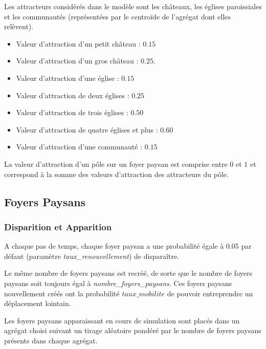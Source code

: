 \documentclass[a4paper,11pt]{article}
\begin{document}
{\bigskip
Les attracteurs considérés dans le modèle sont les châteaux, les églises paroissiales et les communautés (représentées par le centroïde de l'agrégat dont elles relèvent).
\begin{itemize}
	\item Valeur d'attraction d'un petit château : $0.15$
	\item Valeur d'attraction d'un gros château : $0.25$.
	\item Valeur d'attraction d'une église : $0.15$
	\item Valeur d'attraction de deux églises : $0.25$
	\item Valeur d'attraction de trois églises : $0.50$
	\item Valeur d'attraction de quatre églises et plus : $0.60$
	\item Valeur d'attraction d'une communauté : $0.15$
\end{itemize}

La valeur d'attraction d'un pôle sur un foyer paysan est comprise entre $0$ et $1$ et correspond à la somme des valeurs d'attraction des attracteurs du pôle.

\subsection{Foyers Paysans}

\subsubsection{Disparition et Apparition}
A chaque pas de temps, chaque foyer paysan a une probabilité égale à 0.05 par défaut (paramètre \textit{taux\_renouvellement}) de disparaître.

Le même nombre de foyers paysans est recréé, de sorte que le nombre de foyers paysans soit toujours égal à \textit{nombre\_foyers\_paysans}. Ces foyers paysans nouvellement créés ont la probabilité $taux\_mobilite$ de pouvoir entreprendre un déplacement lointain.

Les foyers paysans apparaissant en cours de simulation sont placés dans un agrégat choisi suivant un tirage aléatoire pondéré par le nombre de foyers paysans présents dans chaque agrégat.

}
\end{document}
